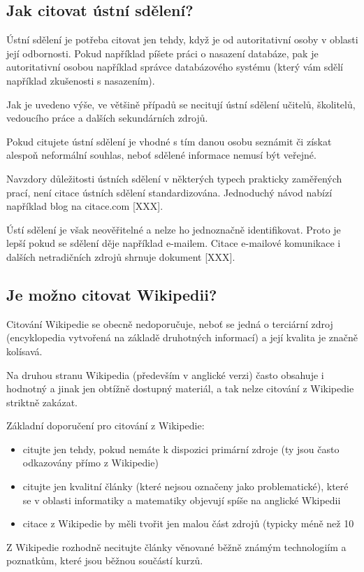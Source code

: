 \documentclass[male,czech,api_bc]{kitheses}
\begin{document}
\subsection{Jak citovat ústní sdělení?}

Ústní sdělení je potřeba citovat jen tehdy, když je od autoritativní osoby v oblasti její odbornosti. Pokud například píšete práci o nasazení databáze, pak je autoritativní osobou například
správce databázového systému (který vám sdělí například zkušenosti s nasazením).

Jak je uvedeno výše, ve většině případů se necitují ústní sdělení učitelů, školitelů, vedoucího práce a dalších sekundárních zdrojů.

Pokud citujete ústní sdělení je vhodné s tím danou osobu seznámit či získat alespoň neformální souhlas, neboť sdělené informace nemusí být veřejné.

Navzdory důležitosti ústních sdělení v některých typech prakticky zaměřených prací, není citace ústních sdělení standardizována. Jednoduchý návod nabízí například blog na citace.com [XXX].

Ústí sdělení je však neověřitelné a nelze ho jednoznačně identifikovat. Proto je lepší pokud se sdělení děje například e-mailem. Citace e-mailové komunikace i dalších netradičních zdrojů shrnuje
dokument [XXX].

\subsection{Je možno citovat Wikipedii?}

Citování Wikipedie se obecně nedoporučuje, neboť se jedná o terciární zdroj (encyklopedia vytvořená na základě druhotných informací) a její kvalita je značně kolísavá.

Na druhou stranu Wikipedia (především v anglické verzi) často obsahuje i hodnotný a jinak jen obtížně dostupný materiál, a tak nelze citování z Wikipedie striktně zakázat.

Základní doporučení pro citování z Wikipedie:

\begin{itemize}
\item citujte jen tehdy, pokud nemáte k dispozici primární zdroje (ty jsou často odkazovány přímo
z Wikipedie)
\item  citujte jen kvalitní články (které nejsou označeny jako problematické), které se v oblasti
informatiky a matematiky objevují spíše na anglické Wkipedii
\item citace z Wikipedie by měli tvořit jen malou část zdrojů (typicky méně než 10%
\end{itemize}

Z Wikipedie rozhodně necitujte články věnované běžně známým technologiím a poznatkům, které jsou běžnou součástí kurzů. 
\end{document}
